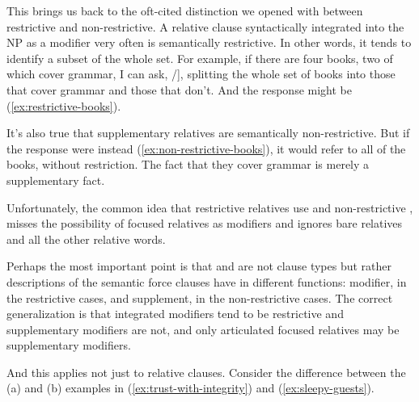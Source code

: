 This brings us back to the oft-cited distinction we opened with between restrictive and non-restrictive. A relative clause syntactically integrated into the NP as a modifier very often is semantically restrictive. In other words, it tends to identify a subset of the whole set. For example, if there are four books, two of which cover grammar, I can ask, /], splitting the whole set of books into those that cover grammar and those that don't. And the response might be (\ref{ex:restrictive-books}).

\label{ex:restrictive-books}
\z
It's also true that supplementary relatives are semantically non-restrictive. But if the response were instead (\ref{ex:non-restrictive-books}), it would refer to all of the books, without restriction. The fact that they cover grammar is merely a supplementary fact. 

\label{ex:non-restrictive-books}
\z
Unfortunately, the common idea that restrictive relatives use  and non-restrictive , misses the possibility of focused relatives as modifiers and ignores bare relatives and all the other relative words.

\ea
{}
\z
\z
\ea
{}
\z
\z
Perhaps the most important point is that  and  are not clause types but rather descriptions of the semantic force clauses have in different functions: modifier, in the restrictive cases, and supplement, in the non-restrictive cases. The correct generalization is that integrated modifiers tend to be restrictive and supplementary modifiers are not, and only articulated focused relatives may be supplementary modifiers.

And this applies not just to relative clauses. Consider the difference between the (a) and (b) examples in (\ref{ex:trust-with-integrity}) and (\ref{ex:sleepy-guests}).

\ea \label{ex:trust-with-integrity}
    \z
\z
\ea \label{ex:sleepy-guests}
    \z
\z
{}

